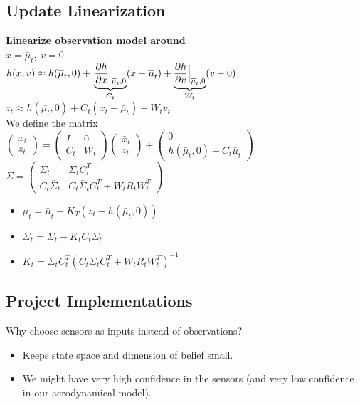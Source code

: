 \subsection*{Update Linearization}
\textbf{Linearize observation model around\\
$x = \bar{\mu}_t$, $v=0$}\\
$h(x, v) \approx h(\bar{\mu}_t, 0) + \\
\underbrace{\dfrac{\partial h}{\partial x}\Bigr|_{\substack{\bar{\mu}_t,
0}}}_{C_t}(x - \bar{\mu}_t) +
\underbrace{\dfrac{\partial h}{\partial v}\Bigr|_{\substack{\bar{\mu}_t,
0}}}_{W_t}(v - 0)$\\
$z_t \approx h(\bar{\mu_t}, 0) + C_t (x_t - \bar{\mu}_t) + W_t  v_t$\\
We define the matrix\\
$
\begin{pmatrix}
  x_t \\ z_t
\end{pmatrix} =
\begin{pmatrix}
  I & 0\\C_t & W_t
\end{pmatrix}
\begin{pmatrix}
  \bar{x}_t \\ z_t
\end{pmatrix} +
\begin{pmatrix}
  0 \\ h(\bar{\mu}_t, 0) - C_t \bar{\mu}_t
\end{pmatrix}
$
$
\Sigma =
\begin{pmatrix}
  \bar{\Sigma_t} & \bar{\Sigma}_t C_t^T\\
  C_t \bar{\Sigma}_t & C_t \bar{\Sigma}_t C_t^T + W_t R_t W_t^T
\end{pmatrix}
$

\begin{itemize}
  \item $\mu_t = \bar{\mu}_t + K_T(z_t - h(\bar{\mu}_t, 0))$
  \item $\Sigma_t = \bar{\Sigma}_t - K_t C_t \bar{\Sigma}_t$
  \item $K_t = \bar{\Sigma}_t C_t^T (C_t \bar{\Sigma}_t C_t^T + W_t R_t
    W_t^T)^{-1}$
\end{itemize}

\subsection*{Project Implementations}
Why choose sensors as inputs instead of observations?
\begin{itemize}
  \item Keeps state space and dimension of belief small.
  \item We might have very high confidence in the sensors (and very low
    confidence in our aerodynamical model).
\end{itemize}

